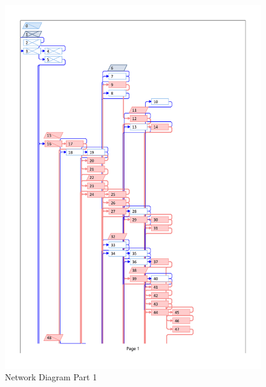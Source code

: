 \begin{appendices}
\begin{figure}[H]
\centering
\includegraphics[scale=0.2323]{network_diagram/network_diagram-1.png}
\caption{Network Diagram Part 1}
\end{figure}
\begin{figure}[H]
\centering

\end{figure}
\end{appendices}
